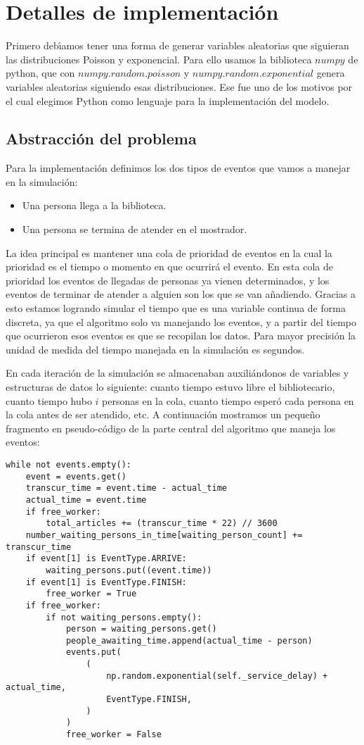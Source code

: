 \documentclass{article}
\begin{document}
\section{Detalles de implementaci\'on}
    Primero deb\'{\i}amos tener una forma de generar variables aleatorias que siguieran las distribuciones Poisson y exponencial. Para ello usamos 
    la biblioteca $numpy$ de python, que con $numpy.random.poisson$ y $numpy.random.exponential$ genera variables aleatorias siguiendo esas 
    distribuciones. Ese fue uno de los motivos por el cual elegimos Python como lenguaje para la implementaci\'on del modelo.

    \subsection*{Abstracci\'on del problema}
    Para la implementaci\'on definimos los dos tipos de eventos que vamos a manejar en la simulaci\'on: 
    \begin{itemize}
        \item Una persona llega a la biblioteca.
        \item Una persona se termina de atender en el mostrador.
    \end{itemize}
    La idea principal es mantener una cola de prioridad de eventos en la cual la prioridad es el tiempo o momento en que ocurrir\'a el evento.
    En esta cola de prioridad los eventos de llegadas de personas ya vienen determinados, y los eventos de terminar de atender a alguien son los 
    que se van añadiendo. Gracias a esto estamos logrando simular el tiempo que es una variable continua de forma discreta, ya que el algoritmo 
    solo va manejando los eventos, y a partir del tiempo que ocurrieron esos eventos es que se recopilan los datos. Para mayor precisi\'on la unidad 
    de medida del tiempo manejada en la simulaci\'on es segundos.

    En cada iteraci\'on de la simulaci\'on se almacenaban auxili\'andonos de variables y estructuras de datos lo siguiente: cuanto tiempo estuvo libre 
    el bibliotecario, cuanto tiempo hubo $i$ personas en la cola, cuanto tiempo esper\'o cada persona en la cola antes de ser atendido, etc. A continuaci\'on
    mostramos un pequeño fragmento en pseudo-c\'odigo de la parte central del algoritmo que maneja los eventos:

    \begin{lstlisting}
while not events.empty():
    event = events.get()
    transcur_time = event.time - actual_time
    actual_time = event.time
    if free_worker:
        total_articles += (transcur_time * 22) // 3600
    number_waiting_persons_in_time[waiting_person_count] += transcur_time
    if event[1] is EventType.ARRIVE:
        waiting_persons.put((event.time))
    if event[1] is EventType.FINISH:
        free_worker = True
    if free_worker:
        if not waiting_persons.empty():
            person = waiting_persons.get()
            people_awaiting_time.append(actual_time - person)
            events.put(
                (
                    np.random.exponential(self._service_delay) + actual_time,
                    EventType.FINISH,
                )
            )
            free_worker = False
    \end{lstlisting}
\end{document}
